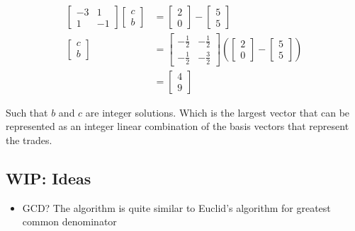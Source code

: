 \documentclass[letterpaper, 12pt]{article}
\begin{document}
\begin{align*}
\begin{bmatrix}
    -3 & 1\\
    1 & -1
\end{bmatrix}
\begin{bmatrix}
    c\\
    b
\end{bmatrix}
&=
\begin{bmatrix}
    2\\
    0
\end{bmatrix}
 -
\begin{bmatrix}
    5\\
    5
\end{bmatrix}
\\
\begin{bmatrix}
    c\\
    b
\end{bmatrix}
&=
\begin{bmatrix}
    -\frac{1}{2} & -\frac{1}{2}\\
    -\frac{1}{2} & -\frac{3}{2}
\end{bmatrix}
(
\begin{bmatrix}
    2\\
    0
\end{bmatrix}
 -
\begin{bmatrix}
    5\\
    5
\end{bmatrix}
)\\
&= 
\begin{bmatrix}
    4\\
    9
\end{bmatrix}
\end{align*}
\par Such that $b$ and $c$ are integer solutions.
Which is the largest vector that can be represented as an integer linear combination of the basis vectors that represent the trades.
\subsection{WIP: Ideas}
\begin{itemize}
    \item GCD? The algorithm is quite similar to Euclid's algorithm for greatest common denominator
\end{itemize}
\end{document}
